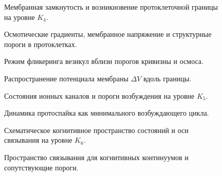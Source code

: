 \begin{figure}[p]
  \centering
  
  \caption{Мембранная замкнутость и возникновение протоклеточной границы
           на уровне \texorpdfstring{\(K_4\)}{K_4}.}
  \label{fig:membrane-closure}
\end{figure}

\begin{figure}[p]
  \centering
  
  \caption{Осмотические градиенты, мембранное напряжение и структурные пороги
           в протоклетках.}
  \label{fig:gradient-osmosis-tension}
\end{figure}

\begin{figure}[p]
  \centering
  
  \caption{Режим фликеринга везикул вблизи порогов кривизны и осмоса.}
  \label{fig:vesicle-flickering}
\end{figure}

\begin{figure}[p]
  \centering
  
  \caption{Распространение потенциала мембраны
           \texorpdfstring{\(\Delta V\)}{\Delta V} вдоль границы.}
  \label{fig:dv-propagation-membrane}
\end{figure}

\begin{figure}[p]
  \centering
  
  \caption{Состояния ионных каналов и пороги возбуждения на уровне
           \texorpdfstring{\(K_5\)}{K_5}.}
  \label{fig:ion-channel-states}
\end{figure}

\begin{figure}[p]
  \centering
  
  \caption{Динамика протоспайка как минимального возбуждающего цикла.}
  \label{fig:proto-spike}
\end{figure}

\begin{figure}[p]
  \centering
  
  \caption{Схематическое когнитивное пространство состояний и оси связывания на уровне
           \texorpdfstring{\(K_6\)}{K_6}.}
  \label{fig:cognitive-state-space}
\end{figure}

\begin{figure}[p]
  \centering
  
  \caption{Пространство связывания для когнитивных континуумов и сопутствующие пороги.}
  \label{fig:binding-space}
\end{figure}

